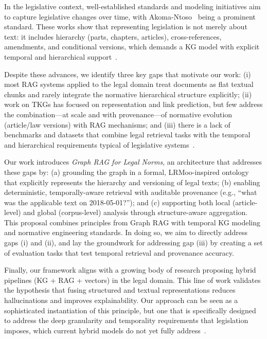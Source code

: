 \documentclass[11pt]{article}
\begin{document}
In the legislative context, well-established standards and modeling initiatives aim to capture legislative changes over time, with Akoma-Ntoso~\cite{palmirani2012legislativexml} being a prominent standard. These works show that representing legislation is not merely about text: it includes hierarchy (parts, chapters, articles), cross-references, amendments, and conditional versions, which demands a KG model with explicit temporal and hierarchical support~\cite{stellato2023legalhtml}.

Despite these advances, we identify three key gaps that motivate our work: (i) most RAG systems applied to the legal domain treat documents as flat textual chunks and rarely integrate the normative hierarchical structure explicitly; (ii) work on TKGs has focused on representation and link prediction, but few address the combination—at scale and with provenance—of normative evolution (article/law versions) with RAG mechanisms; and (iii) there is a lack of benchmarks and datasets that combine legal retrieval tasks with the temporal and hierarchical requirements typical of legislative systems~\cite{pipitone2024legalbenchrag, zhu2025temporal, cai2024survey}.

Our work introduces \emph{Graph RAG for Legal Norms}, an architecture that addresses these gaps by: (a) grounding the graph in a formal, LRMoo-inspired ontology that explicitly represents the hierarchy and versioning of legal texts; (b) enabling deterministic, temporally-aware retrieval with auditable provenance (e.g., ``what was the applicable text on 2018-05-01?''); and (c) supporting both local (article-level) and global (corpus-level) analysis through structure-aware aggregation. This proposal combines principles from Graph RAG with temporal KG modeling and normative engineering standards. In doing so, we aim to directly address gaps (i) and (ii), and lay the groundwork for addressing gap (iii) by creating a set of evaluation tasks that test temporal retrieval and provenance accuracy.

Finally, our framework aligns with a growing body of research proposing hybrid pipelines (KG + RAG + vectors) in the legal domain. This line of work validates the hypothesis that fusing structured and textual representations reduces hallucinations and improves explainability. Our approach can be seen as a sophisticated instantiation of this principle, but one that is specifically designed to address the deep granularity and temporality requirements that legislation imposes, which current hybrid models do not yet fully address~\cite{barron2025bridging}.
\end{document}
